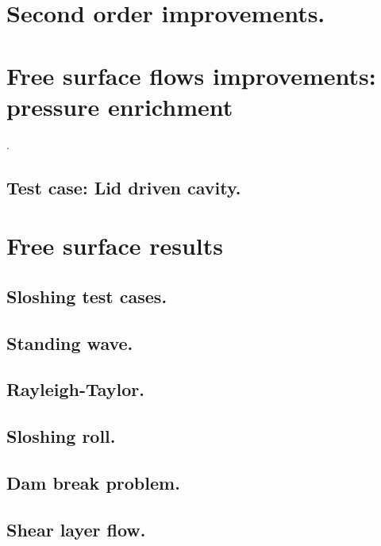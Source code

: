 \documentclass[a4paper,conference]{IEEEtran}
\begin{document}
\section{Second order improvements.}

\section{Free surface flows improvements: pressure enrichment}. %

\subsection{Test case: Lid driven cavity.}%

\section{Free surface results}


\subsection{Sloshing test cases.}%

\subsection{Standing wave.}%

\subsection{Rayleigh-Taylor.}

\subsection{Sloshing roll.}%

\subsection{Dam break problem.}%

\subsection{Shear layer flow.}
\end{document}
